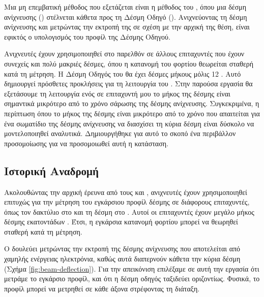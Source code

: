 Μια μη επεμβατική μέθοδος που εξετάζεται είναι η μέθοδος του , όπου μια δέσμη ανίχνευσης () στέλνεται κάθετα προς τη Δέσμη Οδηγό (). 
Ανιχνεύοντας τη δέσμη ανίχνευσης και μετρώντας την εκτροπή της σε σχέση με την αρχική της θέση, είναι εφικτός ο υπολογισμός του προφίλ της Δέσμης Οδηγού.

Ανιχνευτές  έχουν χρησιμοποιηθεί στο παρελθόν σε άλλους επιταχυντές που έχουν συνεχείς και πολύ μακριές δέσμες, όπου η κατανομή του φορτίου θεωρείται σταθερή κατά τη μέτρηση.
Η Δέσμη Οδηγός του  θα έχει δέσμες μήκους μόλις \num{12} . 
Αυτό δημιουργεί πρόσθετες προκλήσεις για τη λειτουργία του .
Στην παρούσα εργασία θα εξετάσουμε τη λειτουργία ενός  σε επιταχυντή μου το μήκος της δέσμης είναι σημαντικά μικρότερο από το χρόνο σάρωσης της δέσμης ανίχνευσης. 
Συγκεκριμένα, η περίπτωση όπου το μήκος της δέσμης είναι μικρότερο από το χρόνο που απαιτείται για ένα σωματίδιο της δέσμης ανίχνευσης να διασχίσει τη κύρια δέσμη είναι δύσκολο να μοντελοποιηθεί αναλυτικά. 
Δημιουργήθηκε για αυτό το σκοπό ένα περιβάλλον προσομοίωσης για να προσομοιωθεί αυτή η κατάσταση.

\subsection{Ιστορική Αναδρομή} %
Ακολουθώντας την αρχική έρευνα από τους  και  \cite{Pasour1992}, ανιχνευτές  έχουν χρησιμοποιηθεί επιτυχώς για την μέτρηση του εγκάρσιου προφίλ δέσμης σε διάφορους επιταχυντές, όπως τον δακτύλιο  στο  \cite{Aleksandrov2005} \cite{Blokland2009} και τη δέσμη  στο  \cite{Roy2005}. 
Αυτοί οι επιταχυντές έχουν μεγάλο μήκος δέσμης εκατοντάδων . 
Έτσι, η εγκάρσια κατανομή φορτίου μπορεί να θεωρηθεί σταθερή κατά τη μέτρηση.

Ο  δουλεύει μετρώντας την εκτροπή της δέσμης ανίχνευσης που αποτελείται από χαμηλής ενέργειας ηλεκτρόνια, καθώς αυτά διαπερνούν κάθετα την κύρια δέσμη (Σχήμα \ref{fig:beam-deflection}).
Για την απεικόνιση επιλέξαμε σε αυτή την εργασία ότι μετράμε το εγκάρσιο προφίλ, και ότι η δέσμη οδηγός ταξιδεύει οριζοντίως. 
Φυσικά, το προφίλ μπορεί να μετρηθεί σε κάθε άξονα στρέφοντας τη διάταξη. 


